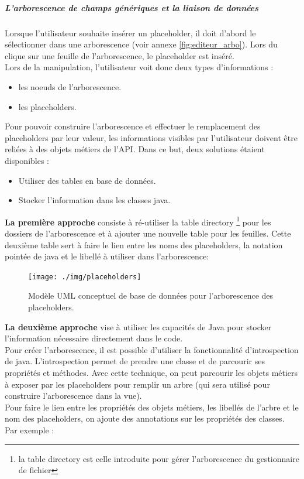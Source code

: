 \subparagraph*{L'arborescence de champs génériques et la liaison de données}

Lorsque l'utilisateur souhaite insérer un placeholder, il doit d'abord le sélectionner dans une arborescence (voir annexe \ref{fig:editeur_arbo}). 
Lors du clique sur une feuille de l'arborescence, le placeholder est inséré.  \\

Lors de la manipulation, l'utilisateur voit donc deux types d'informations : 
\begin{itemize}
\item les noeuds de l'arborescence.
\item les placeholders.
\end{itemize}

Pour pouvoir construire l'arborescence et effectuer le remplacement des placeholders par leur valeur, les informations visibles par l'utilisateur doivent être reliées à des objets métiers de l'API.
Dans ce but, deux solutions étaient disponibles : 
\begin{itemize}
\item Utiliser des tables en base de données.
\item Stocker l'information dans les classes java. %
\end{itemize}

\textbf{La première approche} consiste à ré-utiliser la table directory \footnote{la table directory est celle introduite pour gérer l'arborescence du gestionnaire de fichier} pour les dossiers de l'arborescence et à ajouter une nouvelle table pour les feuilles. Cette deuxième table sert à faire le lien entre les noms des placeholders, la notation pointée de java et le libellé à utiliser dans l'arborescence:\\

\begin{figure}[H]
  \centering
  \texttt{[image: ./img/placeholders]}
  \caption{\label{fig:mb_va_ast} Modèle UML conceptuel de base de données pour l'arborescence des placeholders.}
\end{figure}


\textbf{La deuxième approche} vise à utiliser les capacités de Java pour stocker l'information nécessaire directement dans le code.\\
Pour créer l'arborescence, il est possible d'utiliser la fonctionnalité d'introspection de java. L'introspection permet de prendre une classe et de parcourir ses propriétés et méthodes. Avec cette technique, on peut parcourir les objets métiers à exposer par les placeholders pour remplir un arbre (qui sera utilisé pour construire l'arborescence dans la vue). \\
Pour faire le lien entre les propriétés des objets métiers, les libellés de l'arbre et le nom des placeholders, on ajoute des annotations sur les propriétés des classes.\\
Par exemple :

